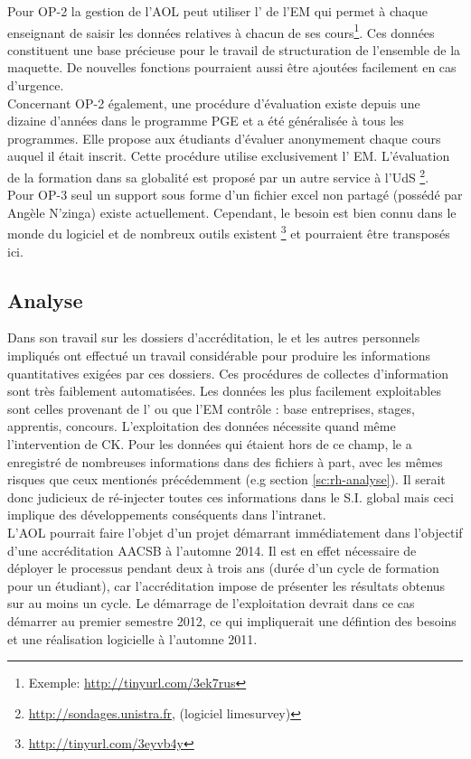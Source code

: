\documentclass{book}
\begin{document}
Pour OP-2 la gestion de l'AOL peut utiliser l' de l'EM qui
permet à chaque enseignant de saisir les données relatives à chacun de ses 
cours\footnote{Exemple: \url{http://tinyurl.com/3ek7rus}}. Ces données 
constituent une base précieuse pour le travail de structuration de l'ensemble
de la maquette. De nouvelles fonctions pourraient aussi être ajoutées facilement
en cas d'urgence.\\

Concernant OP-2 également, une procédure d'évaluation existe depuis une dizaine 
d'années dans le programme PGE et a été généralisée à tous les programmes. Elle 
propose aux étudiants d'évaluer anonymement chaque cours auquel il était inscrit. 
Cette procédure utilise exclusivement l' EM.
L'évaluation de la formation dans sa globalité est proposé par un autre service à l'UdS%
\footnote{\url{http://sondages.unistra.fr}, (logiciel limesurvey)}.\\

Pour OP-3 seul un support sous forme d'un fichier excel non partagé (possédé par Angèle 
N'zinga) existe actuellement. Cependant, le besoin est
bien connu dans le monde du logiciel et de nombreux outils existent%
\footnote{\url{http://tinyurl.com/3eyvb4y}}
et pourraient être transposés ici.


\subsection{Analyse}
\label{sc:sop-analyse}

Dans son travail sur les dossiers d'accréditation, le \sop et les autres
personnels impliqués ont effectué un travail considérable pour produire
les informations quantitatives exigées par ces dossiers. Ces procédures
de collectes d'information sont très faiblement automatisées. Les données
les plus facilement exploitables sont celles provenant de l'
ou que l'EM contrôle : base entreprises, stages, apprentis, concours. 
L'exploitation des données nécessite quand même l'intervention de CK. 
Pour les données qui étaient hors de ce champ, le \sop a enregistré de
nombreuses informations dans des fichiers à part, avec les mêmes risques
que ceux mentionés précédemment (e.g section \ref{sc:rh-analyse}). 
Il serait donc judicieux de ré-injecter toutes ces informations dans le S.I.
global mais ceci implique des développements conséquents dans l'intranet.\\


L'AOL pourrait faire l'objet d'un projet démarrant immédiatement dans
l'objectif d'une accréditation AACSB à l'automne 2014. Il est en effet 
nécessaire de déployer le processus pendant deux à trois ans (durée
d'un cycle de formation pour un étudiant), car l'accréditation impose de
présenter les résultats obtenus sur au moins un cycle. Le démarrage de
l'exploitation devrait dans ce cas démarrer au premier semestre 2012,
ce qui impliquerait une défintion des besoins et une réalisation logicielle
à l'automne 2011.
\end{document}
